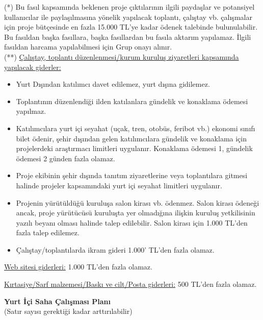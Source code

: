 {\footnotesize
\noindent (*) Bu fasıl kapsamında beklenen proje çıktılarının ilgili paydaşlar ve potansiyel kullanıcılar ile paylaşılmasına yönelik yapılacak toplantı, çalıştay vb. çalışmalar için proje bütçesinde en fazla 15.000 TL'ye kadar ödenek talebinde bulunulabilir. Bu fasıldan başka fasıllara, başka fasıllardan bu fasıla aktarım yapılamaz. İlgili fasıldan harcama yapılabilmesi için Grup onayı alınır.\\
\noindent (**) \underline{Çalıştay, toplantı düzenlenmesi/kurum kuruluş ziyaretleri kapsamında yapılacak giderler:}
\begin{itemize}
    \item Yurt Dışından katılımcı davet edilemez, yurt dışına gidilemez.
    \item  Toplantının düzenlendiği ilden katılanlara gündelik ve konaklama ödemesi yapılmaz.
    \item  Katılımcılara yurt içi seyahat (uçak, tren, otobüs, feribot vb.) ekonomi sınıfı bilet ödenir, şehir dışından gelen katılımcılara gündelik ve konaklama için projelerdeki araştırmacı limitleri uygulanır. Konaklama ödemesi 1, gündelik ödemesi 2 günden fazla olamaz. 
    \item  Proje ekibinin şehir dışında tanıtım ziyaretlerine veya toplantılara gitmesi halinde projeler kapsamındaki yurt içi seyahat limitleri uygulanır. 
    \item  Projenin yürütüldüğü kuruluşa salon kirası vb. ödenmez. Salon kirası ödeneği ancak, proje yürütücüsü kuruluşta yer olmadığına ilişkin kuruluş yetkilisinin yazılı beyanı olması halinde talep edilebilir. Salon kirası için 1.000 TL'den fazla talep edilemez.
    \item  Çalıştay/toplantılarda ikram gideri 1.000' TL'den fazla olamaz.\\
\end{itemize}

\noindent \underline{Web sitesi giderleri:} 1.000 TL'den fazla olamaz.

\noindent \underline{Kırtasiye/Sarf malzemesi/Baskı ve cilt/Posta giderleri:} 500 TL'den fazla olamaz. 
}

\begin{center}
    \textbf{Yurt İçi Saha Çalışması Planı}\\
 (Satır sayısı gerektiği kadar arttırılabilir)
\end{center}

